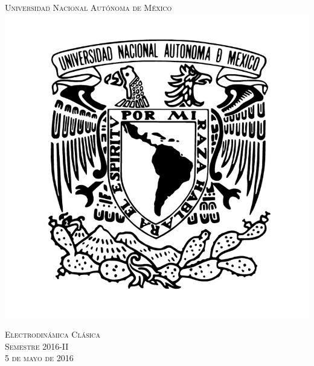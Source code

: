 \documentclass[a4paper,11pt]{article}
\numberwithin{equation}{section}
\begin{document}
\begin{titlepage}
\thispagestyle{fancy}

\newcommand{\HRule}{\rule{\linewidth}{0.5mm}} %

\center %
 

\textsc{\LARGE Universidad Nacional Autónoma de México}\\[0.3cm] %


\includegraphics[scale=0.17]{unam}


\textsc{\Large Electrodinámica Clásica}\\[0.3cm] %
\textsc{\large Semestre 2016-II}\\[0.3cm] %
\textsc{\large 5 de mayo de 2016}\\ %


\end{titlepage}
\end{document}

